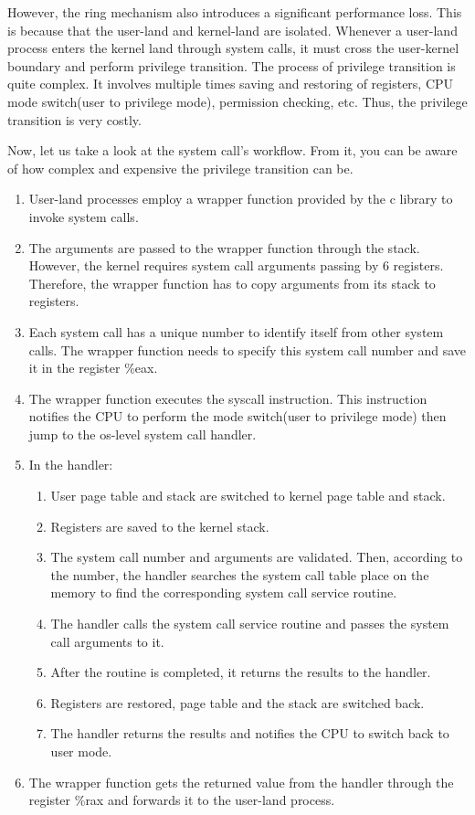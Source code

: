  However, the ring mechanism also introduces a significant performance loss. 
 This is because that the user-land and kernel-land are isolated. Whenever a user-land 
 process enters the kernel land through system calls, it must cross the user-kernel boundary 
 and perform privilege transition.  The process of privilege transition is quite complex. 
 It involves multiple times saving and restoring of registers, CPU mode switch(user to privilege mode), 
 permission checking, etc. Thus, the privilege transition is very costly.

 Now, let us take a look at the system call's workflow. From it, you can be aware of 
 how complex and expensive the privilege transition can be.
 \begin{enumerate}
  \item User-land processes employ a wrapper function provided by the c library to invoke system calls.
  \item The arguments are passed to the wrapper function through the stack. However, the kernel requires system call arguments passing by 6 registers. Therefore, the wrapper function has to copy arguments from its stack to registers.
  \item Each system call has a unique number to identify itself from other system calls. The wrapper function needs to specify this system call number and save it in the register \%eax.
  \item The wrapper function executes the syscall instruction.  This instruction notifies the CPU to perform the mode switch(user to privilege mode) then jump to the os-level system call handler.
  \item In the handler:
  \begin{enumerate}
    \item User page table and stack are switched to kernel page table and stack.
    \item Registers are saved to the kernel stack.
    \item The system call number and arguments are validated. Then, according to the number, the handler searches the system call table place on the memory to find the corresponding system call service routine.
    \item The handler calls the system call service routine and passes the system call arguments to it.
    \item After the routine is completed, it returns the results to the handler.
    \item Registers are restored, page table and the stack are switched back.
    \item The handler returns the results and notifies the CPU to switch back to user mode.
  \end{enumerate}
  \item The wrapper function gets the returned value from the handler through the register \%rax and forwards it to the user-land process.
  
\end{enumerate}


